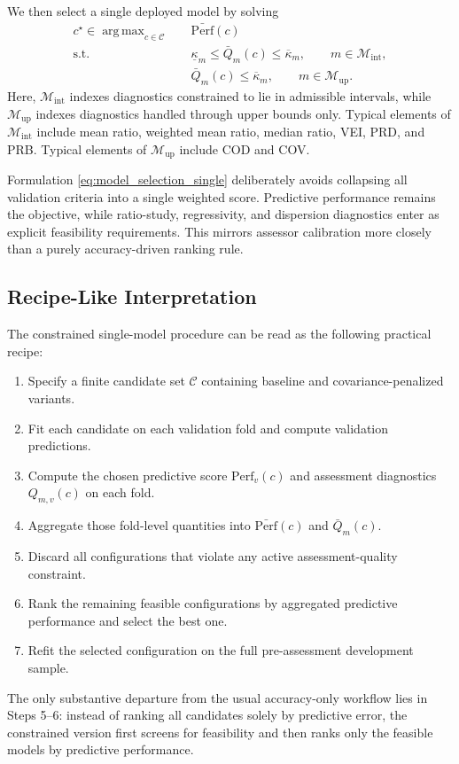 \documentclass[12pt]{article}
\theoremstyle{plain}
\theoremstyle{definition}
\newcommand{\argmax}{\mathop{\mathrm{arg\,max}}}
\begin{document}
We then select a single deployed model by solving
\begin{align}
\label{eq:model_selection_single}
c^\star
\in
\argmax_{c\in\mathcal C}
\quad
& \bar{\mathrm{Perf}}(c)
\\
\text{s.t.}\quad
& \underline{\kappa}_m\le \bar Q_m(c)\le \overline{\kappa}_m,
\qquad m\in\mathcal M_{\mathrm{int}},
\nonumber\\
& \bar Q_m(c)\le \overline{\kappa}_m,
\qquad m\in\mathcal M_{\mathrm{up}}.
\nonumber
\end{align}
Here, \(\mathcal M_{\mathrm{int}}\) indexes diagnostics constrained to lie in admissible intervals, while \(\mathcal M_{\mathrm{up}}\) indexes diagnostics handled through upper bounds only. Typical elements of \(\mathcal M_{\mathrm{int}}\) include mean ratio, weighted mean ratio, median ratio, VEI, PRD, and PRB. Typical elements of \(\mathcal M_{\mathrm{up}}\) include COD and COV.

Formulation \eqref{eq:model_selection_single} deliberately avoids collapsing all validation criteria into a single weighted score. Predictive performance remains the objective, while ratio-study, regressivity, and dispersion diagnostics enter as explicit feasibility requirements. This mirrors assessor calibration more closely than a purely accuracy-driven ranking rule.

\subsection{Recipe-Like Interpretation}

The constrained single-model procedure can be read as the following practical recipe:
\begin{enumerate}[leftmargin=1.6em]
    \item Specify a finite candidate set \(\mathcal C\) containing baseline and covariance-penalized variants.
    \item Fit each candidate on each validation fold and compute validation predictions.
    \item Compute the chosen predictive score \(\mathrm{Perf}_v(c)\) and assessment diagnostics \(Q_{m,v}(c)\) on each fold.
    \item Aggregate those fold-level quantities into \(\bar{\mathrm{Perf}}(c)\) and \(\bar Q_m(c)\).
    \item Discard all configurations that violate any active assessment-quality constraint.
    \item Rank the remaining feasible configurations by aggregated predictive performance and select the best one.
    \item Refit the selected configuration on the full pre-assessment development sample.
\end{enumerate}
The only substantive departure from the usual accuracy-only workflow lies in Steps 5--6: instead of ranking all candidates solely by predictive error, the constrained version first screens for feasibility and then ranks only the feasible models by predictive performance.
\end{document}
